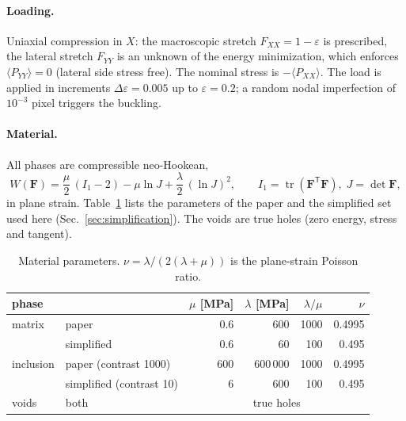 \documentclass[11pt,a4paper]{article}
\begin{document}
\paragraph{Loading.} Uniaxial compression in $X$: the macroscopic stretch $F_{XX} = 1 - \varepsilon$ is prescribed,
the lateral stretch $F_{YY}$ is an unknown of the energy minimization, which enforces $\langle P_{YY}\rangle = 0$
(lateral side stress free). The nominal stress is $-\langle P_{XX}\rangle$. The load is applied in increments
$\Delta\varepsilon = 0.005$ up to $\varepsilon = 0.2$; a random nodal imperfection of $10^{-3}$ pixel triggers the
buckling.

\paragraph{Material.} All phases are compressible neo-Hookean,
\begin{equation}
  W(\bm F) = \frac{\mu}{2}\,(I_1 - 2) - \mu \ln J + \frac{\lambda}{2}\,(\ln J)^2 ,
  \qquad I_1 = \operatorname{tr}(\bm F^{\mathsf T}\bm F),\; J = \det\bm F ,
  \label{eq:nh}
\end{equation}
in plane strain. Table~\ref{tab:material} lists the parameters of the paper and the simplified set used here
(Sec.~\ref{sec:simplification}). The voids are true holes (zero energy, stress and tangent).

\begin{table}[h]
\centering
\caption{Material parameters. $\nu = \lambda / (2(\lambda+\mu))$ is the plane-strain Poisson ratio.}
\label{tab:material}
\begin{tabular}{llrrrr}
\toprule
phase & & $\mu$ [MPa] & $\lambda$ [MPa] & $\lambda/\mu$ & $\nu$ \\
\midrule
matrix    & paper~\cite{LiRudykh2019} & 0.6 & 600 & 1000 & 0.4995 \\
          & simplified                & 0.6 & 60  & 100  & 0.495  \\
inclusion & paper (contrast 1000)     & 600 & 600\,000 & 1000 & 0.4995 \\
          & simplified (contrast 10)  & 6   & 600 & 100 & 0.495 \\
voids     & both                      & \multicolumn{4}{c}{true holes} \\
\bottomrule
\end{tabular}
\end{table}

\end{document}
